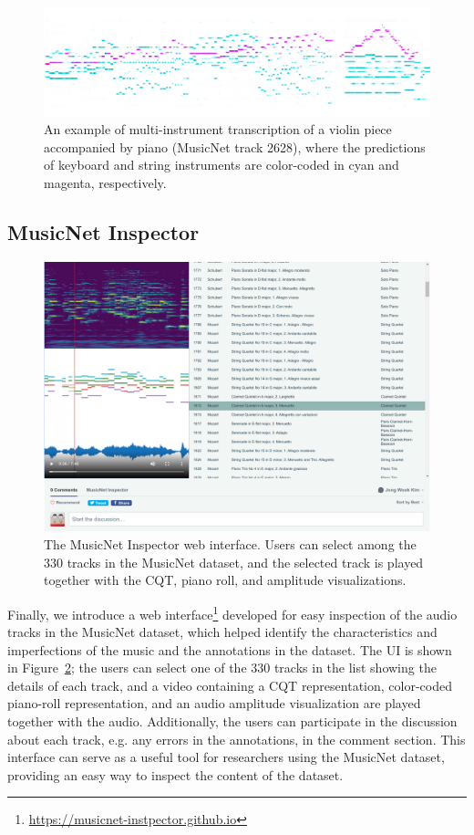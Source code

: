 \begin{figure}
	\centering
	\includegraphics[width=\textwidth]{2628.png}
	\caption{An example of multi-instrument transcription of a violin piece accompanied by piano (MusicNet track 2628), where the predictions of keyboard and string instruments are color-coded in cyan and magenta, respectively. }\label{fig:multi-instrument-example}
\end{figure}

\subsection{MusicNet Inspector}

\begin{figure}[t]
\includegraphics[width=\textwidth]{inspector.png}
\caption{The MusicNet Inspector web interface. Users can select among the 330 tracks in the MusicNet dataset, and the selected track is played together with the CQT, piano roll, and amplitude visualizations.}\label{fig:musicnet-inspector}
\end{figure}

Finally, we introduce a web interface\footnote{\url{https://musicnet-instpector.github.io}} developed for easy inspection of the audio tracks in the MusicNet dataset, which helped identify the characteristics and imperfections of the music and the annotations in the dataset.
The UI is shown in Figure~\ref{fig:musicnet-inspector}; the users can select one of the 330 tracks in the list showing the details of each track, and a video containing a CQT representation, color-coded piano-roll representation, and an audio amplitude visualization are played together with the audio.
Additionally, the users can participate in the discussion about each track, e.g. any errors in the annotations, in the comment section.
This interface can serve as a useful tool for researchers using the MusicNet dataset, providing an easy way to inspect the content of the dataset.


